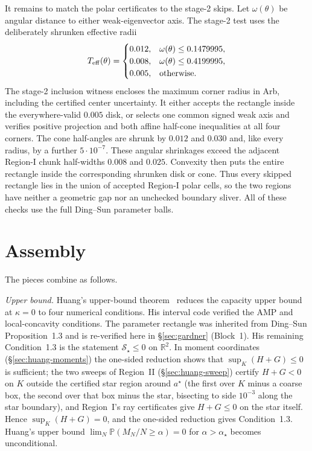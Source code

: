 \documentclass[11pt]{article}
\newcommand{\R}{\mathbb{R}}
\newcommand{\PP}{\mathbb{P}}
\begin{document}
It remains to match the polar certificates to the stage-2 skips.  Let
$\omega(\theta)$ be angular distance to either weak-eigenvector axis.  The
stage-2 test uses the deliberately shrunken effective radii
\[
 T_{\rm eff}(\theta)=
 \begin{cases}
 0.012,&\omega(\theta)\le0.1479995,\\
 0.008,&\omega(\theta)\le0.4199995,\\
 0.005,&\text{otherwise}.
 \end{cases}
\]
The stage-2 inclusion witness encloses the maximum corner radius in Arb,
including the certified center uncertainty. It either accepts the rectangle
inside the everywhere-valid $0.005$ disk, or selects one common signed weak
axis and verifies positive projection and both affine half-cone inequalities
at all four corners. The cone half-angles are shrunk by $0.012$ and $0.030$
and, like every radius, by a further $5\cdot10^{-7}$. These angular
shrinkages exceed the adjacent Region-I chunk half-widths $0.008$ and
$0.025$. Convexity then puts the entire
rectangle inside the corresponding shrunken disk or cone. Thus every skipped
rectangle lies in the union of accepted Region-I polar cells, so the two
regions have neither a geometric gap nor an unchecked boundary sliver. All of
these checks use the full Ding--Sun parameter balls.

\section{Assembly}\label{sec:assembly}

The pieces combine as follows.

\emph{Upper bound.} Huang's upper-bound theorem~\cite{huang2024capacity}
reduces the capacity upper bound at $\kappa=0$ to four numerical conditions.
His interval code verified the AMP and local-concavity conditions. The
parameter rectangle was inherited from Ding--Sun Proposition~1.3 and is
re-verified here in \S\ref{sec:gardner} (Block~1). His remaining
Condition~1.3 is the statement
$\mathcal S_\star\le 0$ on $\R^2$. In moment coordinates
(\S\ref{sec:huang-moments}) the one-sided reduction shows that
$\sup_{K}(H+G)\le 0$ is sufficient; the two sweeps of
Region~II (\S\ref{sec:huang-sweep}) certify $H+G<0$ on $K$ outside the
certified star region around $a^\star$ (the first over $K$ minus a coarse
box, the second over that box minus the star, bisecting to side $10^{-3}$
along the star boundary), and Region~I's ray certificates give $H+G\le0$ on
the star itself. Hence $\sup_K(H+G)=0$, and the one-sided reduction gives
Condition~1.3. Huang's upper bound
$\lim_N \PP(M_N/N\ge\alpha)=0$ for $\alpha>\alpha_\star$ becomes
unconditional.
\end{document}
